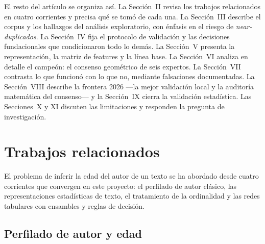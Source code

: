 \documentclass[journal]{IEEEtai}
\begin{document}
El resto del art\'iculo se organiza as\'i. La Secci\'on~II revisa los trabajos relacionados en cuatro corrientes y precisa qu\'e se tom\'o de cada una. La Secci\'on~III describe el corpus y los hallazgos del an\'alisis exploratorio, con \'enfasis en el riesgo de \textit{near-duplicados}. La Secci\'on~IV fija el protocolo de validaci\'on y las decisiones fundacionales que condicionaron todo lo dem\'as. La Secci\'on~V presenta la representaci\'on, la matriz de features y la l\'inea base. La Secci\'on~VI analiza en detalle el campe\'on: el consenso geom\'etrico de seis expertos. La Secci\'on~VII contrasta lo que funcion\'o con lo que no, mediante falsaciones documentadas. La Secci\'on~VIII describe la frontera 2026 ---la mejor validaci\'on local y la auditor\'ia matem\'atica del consenso--- y la Secci\'on~IX cierra la validaci\'on estad\'istica. Las Secciones~X y XI discuten las limitaciones y responden la pregunta de investigaci\'on.

\section{Trabajos relacionados}

El problema de inferir la edad del autor de un texto se ha abordado desde cuatro corrientes que convergen en este proyecto: el perfilado de autor cl\'asico, las representaciones estad\'isticas de texto, el tratamiento de la ordinalidad y las redes tabulares con ensambles y reglas de decisi\'on.

\subsection{Perfilado de autor y edad}
\end{document}
